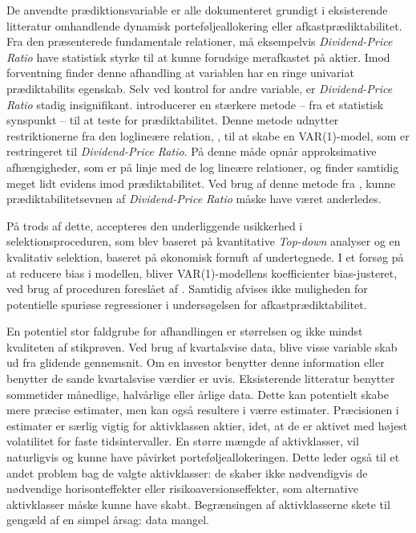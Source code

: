 \documentclass[
  a4paper,
  oneside]{memoir}
\begin{document}
De anvendte prædiktionsvariable er alle dokumenteret grundigt i eksisterende litteratur omhandlende dynamisk porteføljeallokering eller afkastprædiktabilitet. Fra den præsenterede fundamentale relationer, må eksempelvis \emph{Dividend-Price Ratio} have statistisk styrke til at kunne forudsige merafkastet på aktier. Imod forventning finder denne afhandling at variablen har en ringe univariat prædiktabilits egenskab. Selv ved kontrol for andre variable, er \emph{Dividend-Price Ratio} stadig insignifikant. \citep{Cochrane2008} introducerer en stærkere metode -- fra et statistisk synspunkt -- til at teste for prædiktabilitet. Denne metode udnytter restriktionerne fra den loglineære relation, \citep{Campbell1988}, til at skabe en VAR(1)-model, som er restringeret til \emph{Dividend-Price Ratio}. På denne måde opnår \citep{Cochrane2008} approksimative afhængigheder, som er på linje med de log lineære relationer, og finder samtidig meget lidt evidens imod prædiktabilitet. Ved brug af denne metode fra \citep{Cochrane2008}, kunne prædiktabilitetsevnen af \emph{Dividend-Price Ratio} måske have været anderledes.

På trods af dette, accepteres den underliggende usikkerhed i selektionsproceduren, som blev baseret på kvantitative \emph{Top-down} analyser og en kvalitativ selektion, baseret på økonomisk fornuft af undertegnede. I et forsøg på at reducere bias i modellen, bliver VAR(1)-modellens koefficienter bias-justeret, ved brug af proceduren foreslået af \citep{Pope1990}. Samtidig afvises ikke muligheden for potentielle spuriøse regressioner i undersøgelsen for afkastprædiktabilitet.

En potentiel stor faldgrube for afhandlingen er størrelsen og ikke mindst kvaliteten af stikprøven. Ved brug af kvartalsvise data, blive visse variable skab ud fra glidende gennemsnit. Om en investor benytter denne information eller benytter de sande kvartalsvise værdier er uvis. Eksisterende litteratur benytter sommetider månedlige, halvårlige eller årlige data. Dette kan potentielt skabe mere præcise estimater, men kan også resultere i værre estimater. Præcisionen i estimater er særlig vigtig for aktivklassen aktier, idet, at de er aktivet med højest volatilitet for faste tidsintervaller. En større mængde af aktivklasser, vil naturligvis og kunne have påvirket porteføljeallokeringen. Dette leder også til et andet problem bag de valgte aktivklasser: de skaber ikke nødvendigvis de nødvendige horisonteffekter eller risikoaversionseffekter, som alternative aktivklasser måske kunne have skabt. Begrænsingen af aktivklasserne skete til gengæld af en simpel årsag: data mangel.
\end{document}
